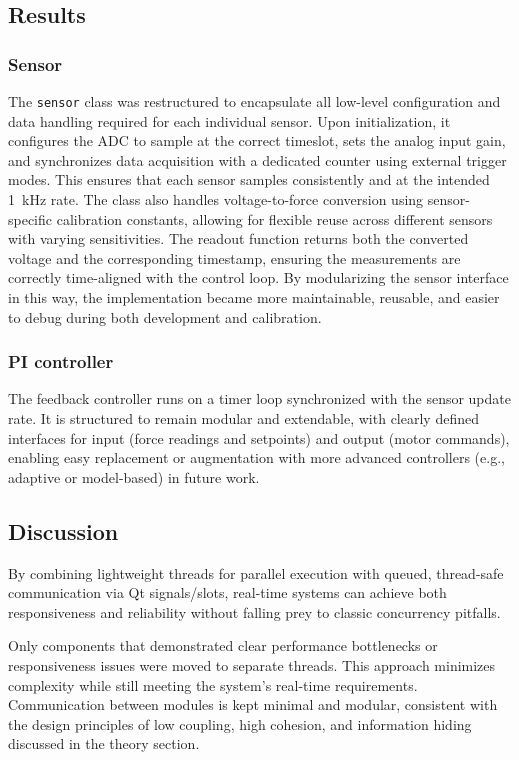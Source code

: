 \subsection{Results}

\subsubsection{Sensor}
The \texttt{sensor} class was restructured to encapsulate all low-level configuration and data handling required for each individual sensor. Upon initialization, it configures the ADC to sample at the correct timeslot, sets the analog input gain, and synchronizes data acquisition with a dedicated counter using external trigger modes. This ensures that each sensor samples consistently and at the intended \SI{1}{\kilo\hertz} rate. The class also handles voltage-to-force conversion using sensor-specific calibration constants, allowing for flexible reuse across different sensors with varying sensitivities. The readout function returns both the converted voltage and the corresponding timestamp, ensuring the measurements are correctly time-aligned with the control loop. By modularizing the sensor interface in this way, the implementation became more maintainable, reusable, and easier to debug during both development and calibration.

\subsubsection{PI controller}
The feedback controller runs on a timer loop synchronized with the sensor update rate. It is structured to remain modular and extendable, with clearly defined interfaces for input (force readings and setpoints) and output (motor commands), enabling easy replacement or augmentation with more advanced controllers (e.g., adaptive or model-based) in future work.

\subsection{Discussion}


By combining lightweight threads for parallel execution with queued, thread-safe communication via Qt signals/slots, real-time systems can achieve both responsiveness and reliability without falling prey to classic concurrency pitfalls.

Only components that demonstrated clear performance bottlenecks or responsiveness issues were moved to separate threads. This approach minimizes complexity while still meeting the system’s real-time requirements. Communication between modules is kept minimal and modular, consistent with the design principles of low coupling, high cohesion, and information hiding discussed in the theory section.

